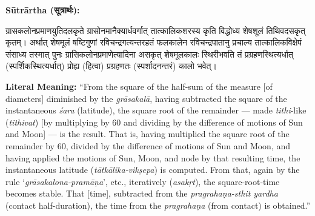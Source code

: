 \documentclass[11pt,a4paper]{article}
\newcommand{\dev}[1]{{\devanagarifont #1}}
\newenvironment{sanskritverse}{%
  \begin{center}\begin{minipage}{0.95\textwidth}
  \setlength{\leftskip}{1em}
  \setlength{\rightskip}{1em}
  \dev
}{\end{minipage}\end{center}}
\newenvironment{paracol}[1]{\begingroup}{\endgroup}
\newcommand{\switchcolumn}[1][]{%
  \ifnum#1=0\relax\else\par\nobreak\vspace{0.5em}\par\nobreak\fi%
}
\begin{document}
\begin{paracol}{2}

\noindent\textbf{Sūtrārtha (\dev{सूत्रार्थः}):}
\begin{sanskritverse}
ग्रासकलोनप्रमाणयुतिदलकृते ग्रासोनमानैक्यार्धवर्गात् तात्कालिकशरस्य कृति विद्धोध्य
शेषशूलं तिथिवदसकृत् कृतम्। अर्थात् शेषमूलं षष्टिगुणां रविचन्द्रगत्यन्तरहतं फलकालेन
रविचन्द्रपातानु प्रचाल्य तात्कालिकविक्षेपं संसाध्य तस्मात् पुनः ग्रासिकलोनप्रमाणेत्यादिना
असकृत् शेषमूलकालः स्थिरीभवति तं प्रग्रहणस्थित्यर्धात् (स्पर्शिकस्थित्यर्धात्) प्रोह्य
(हित्वा) प्रग्रहणतः (स्पर्शादनन्तरं) कालो भवेत्।
\end{sanskritverse}

\switchcolumn

\textbf{Literal Meaning:} ``From the square of the half-sum of the measure [of diameters] diminished by the \textit{grāsakalā}, having subtracted the square of the instantaneous \textit{śara} (latitude), the square root of the remainder --- made \textit{tithi}-like (\textit{tithivat}) [by multiplying by 60 and dividing by the difference of motions of Sun and Moon] --- is the result. That is, having multiplied the square root of the remainder by 60, divided by the difference of motions of Sun and Moon, and having applied the motions of Sun, Moon, and node by that resulting time, the instantaneous latitude (\textit{tātkālika-vikṣepa}) is computed. From that, again by the rule `\textit{grāsakalona-pramāṇa}', etc., iteratively (\textit{asakṛt}), the square-root-time becomes stable. That [time], subtracted from the \textit{pragrahaṇa-sthit yardha} (contact half-duration), the time from the \textit{pragrahaṇa} (from contact) is obtained.''

\end{paracol}

\vspace{0.5em}
\end{document}
